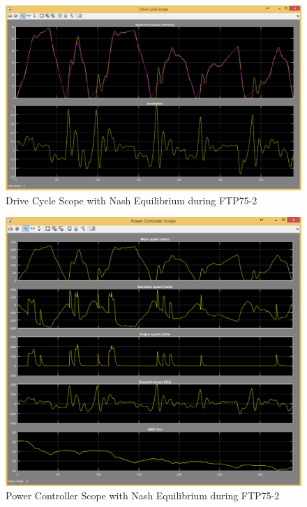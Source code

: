\begin{figure}[h]
\centering
\includegraphics[scale=0.4]{figures/NashEquilibrium/FTP75-2/driveCycle13Juni}
\caption{Drive Cycle Scope with Nash Equilibrium during FTP75-2}
\label{fig:dcne2}
\end{figure}

\begin{figure}[h]
\centering
\includegraphics[scale=0.4]{figures/NashEquilibrium/FTP75-2/powerController13Juni}
\caption{Power Controller Scope with Nash Equilibrium during FTP75-2}
\label{fig:pcne2}
\end{figure}

